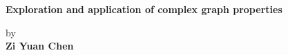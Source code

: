 \begin{titlepage}
    \begin{center}
        \vspace*{1cm}
        
        \Huge
        \textbf{Exploration and application of complex graph properties}
        
        \vspace{0.5cm}
        \LARGE
        by\\
    
        \textbf{Zi Yuan Chen}
        
        \vfill

        \vspace{1.0cm}
        \begin{flushleft}
        \end{flushleft}
        
    \end{center}
    
\end{titlepage}